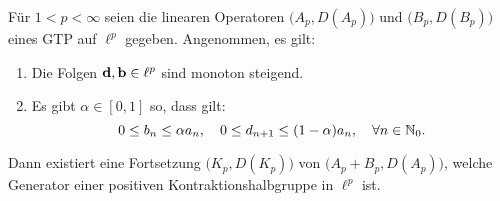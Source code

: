 \begin{fsatz}\label{Störungstheorem für GTP 1}
Für $1<p<\infty$ seien die linearen Operatoren $\big(A_p, D(A_p)\big)$ und  $\big(B_p, D(B_p)\big)$ eines GTP auf $\ell^p$ gegeben. Angenommen, es gilt:
\begin{enumerate}
\item Die Folgen $\textnormal{\textbf{d}}, \textnormal{\textbf{b}}\in \ell^p$ sind monoton steigend.
\item Es gibt $\alpha\in[0,1]$ so, dass gilt:
\begin{equation*}\label{Annahme für Abschätzung}
0\leq b_n\leq \alpha a_n,\quad 0\leq d_{n+1}\leq (1-\alpha)a_n, \quad \forall n\in \mathbb{N}_0.
\end{equation*}
\end{enumerate} 
Dann existiert eine Fortsetzung $\big(K_p, D(K_p)\big)$ von  $\big(A_p+B_p, D(A_p)\big)$, welche Generator einer positiven Kontraktionshalbgruppe in $\ell^p$ ist.
\end{fsatz}



